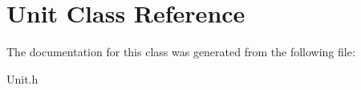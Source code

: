 \hypertarget{class_unit}{}\section{Unit Class Reference}
\label{class_unit}


The documentation for this class was generated from the following file\+:\begin{DoxyCompactItemize}
\item 
Unit.\+h\end{DoxyCompactItemize}
